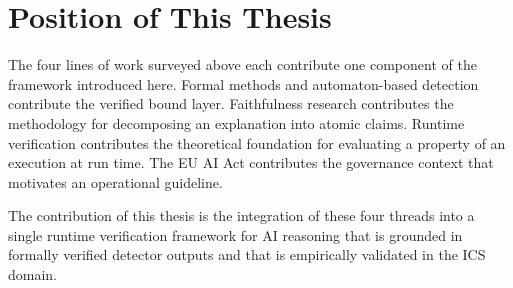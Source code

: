 \section{Position of This Thesis}
\label{sec:position}

The four lines of work surveyed above each contribute one component of the framework
introduced here. Formal methods and automaton-based detection contribute the verified
bound layer. Faithfulness research contributes the methodology for decomposing an
explanation into atomic claims. Runtime verification contributes the theoretical
foundation for evaluating a property of an execution at run time. The EU AI Act
contributes the governance context that motivates an operational guideline.

The contribution of this thesis is the integration of these four threads into a
single runtime verification framework for AI reasoning that is grounded in formally
verified detector outputs and that is empirically validated in the ICS domain.
